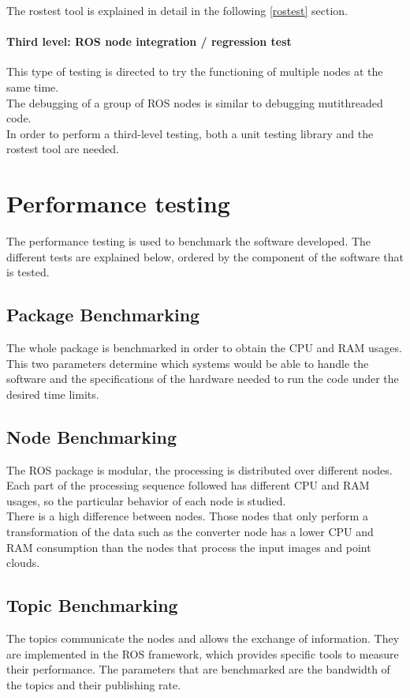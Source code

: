 The rostest tool is explained in detail in the following \ref{rostest} section.

	\subsubsection{Third level: ROS node integration / regression test}
	This type of testing is directed to try the functioning of multiple nodes at the same time. \\

	The debugging of a group of ROS nodes is similar to debugging mutithreaded code. \\

	In order to perform a third-level testing, both a unit testing library and the rostest tool are needed. 


\chapter{Performance testing}
The performance testing is used to benchmark the software developed. The different tests are explained below, ordered by the component of the software that is tested. 


\section{Package Benchmarking}
The whole package is benchmarked in order to obtain the CPU and RAM usages. This two parameters determine which systems would be able to handle the software and the specifications of the hardware needed to run the code under the desired time limits. 

\section{Node Benchmarking}
The ROS package is modular, the processing is distributed over different nodes. Each part of the processing sequence followed has different CPU and RAM usages, so the particular behavior of each node is studied. 
\\

There is a high difference between nodes. Those nodes that only perform a transformation of the data such as the converter node has a lower CPU and RAM consumption than the nodes that process the input images and point clouds. 

\section{Topic Benchmarking}
The topics communicate the nodes and allows the exchange of information. They are implemented in the ROS framework, which provides specific tools to measure their performance.
The parameters that are benchmarked are the bandwidth of the topics and their publishing rate.\\

